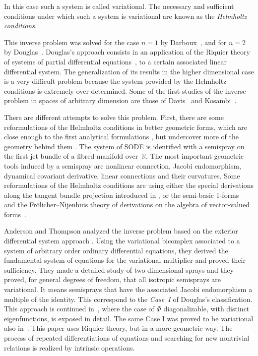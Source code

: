 \documentclass[pdftex]{sigma}
\begin{document}
In this case such a system is called variational. The necessary and
suf\/f\/icient conditions under which such a system is variational are
known as the \emph{Helmholtz conditions}.

This inverse problem was solved for the case $n=1$ by Darboux~\cite{Dar},
and for $n=2$ by Douglas~\cite{douglas41}. Douglas's approach consists
in an application of the Riquier theory of systems of partial dif\/ferential
equations~\cite{Rhi}, to a certain associated linear dif\/ferential
system. The generalization of its results in the higher dimensional
case is a very dif\/f\/icult problem because the system provided by the
Helmholtz conditions is extremely over-determined. Some of the f\/irst
studies of the inverse problem in spaces of arbitrary dimension are
those of Davis~\cite{davis29} and Kosambi~\cite{kosambi35}.

There are dif\/ferent attempts to solve this problem. First, there are
some reformulations of the Helmholtz conditions in better geometric
forms, which are close enough to the f\/irst analytical formulations
\cite{douglas41,santilli78,Sarlet81,sarlet82}, but undercover more
of the geometry behind them \cite{carinena89,crampin81,crampin84a,crampin94,deleon88,krupkova08,massa94}.
The system of SODE is identif\/ied with a semispray on the f\/irst jet
bundle of a f\/ibred manifold over~$\mathbb{R}$. The most important
geometric tools induced by a semispray are nonlinear connection, Jacobi
endomorphism, dynamical covariant derivative, linear connections and
their curvatures. Some reformulations of the Helmholtz conditions
are using either the special derivations along the tangent bundle
projection introduced in \cite{sarlet95}, or the semi-basic 1-forms~\cite{B-C-2010} and the Fr\"olicher--Nijenhuis theory of derivations
on the algebra of vector-valued forms~\cite{frolicher56}.

Anderson and Thompson \cite{anderso92} analyzed the inverse problem
based on the exterior dif\/ferential system approach \cite{BCG91}.
Using the variational bicomplex associated to a system of arbitrary
order ordinary dif\/ferential equations, they derived the fundamental
system of equations for the va\-riatio\-nal multiplier and proved their
suf\/f\/iciency. They made a detailed study of two dimensional sprays
and they proved, for general degrees of freedom, that all isotropic
semisprays are va\-ria\-tional. It means semisprays that have the associated
Jacobi endomorphism a multiple of the identity. This correspond to
the \emph{Case~I} of Douglas's classif\/ication. This approach is continued
in~\cite{Ald-Pr-Sa-TH}, where the case of $\Phi$ diagonalizable,
with distinct eigenfunctions, is exposed in detail. The same Case
I was proved to be variational also in~\cite{Sar-Cram-Mart-integr}.
This paper uses Riquier theory, but in a more geometric way. The process
of repeated dif\/ferentiations of equations and searching for new nontrivial
relations is realized by intrinsic operations.
\end{document}
